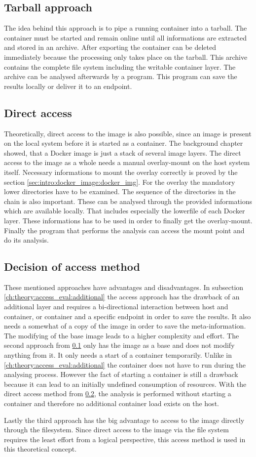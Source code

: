 \subsection{Tarball approach} 
\label{ch:theory:access_eval:tarball}
The idea behind this approach is to pipe a running container into a tarball. The container must be started and remain online until all informations are extracted and stored in an archive.
After exporting the container can be deleted immediately because the processing only takes place on the tarball.
This archive contains the complete file system including the writable container layer. The archive can be analysed afterwards by a program. This program can save the results locally or deliver it to an endpoint.

\subsection{Direct access} 
\label{ch:theory:access_eval:direct_access}
Theoretically, direct access to the image is also possible, since an image is present on the local system before it is started as a container.
The background chapter showed, that a Docker image is just a stack of several image layers. The direct access to the image as a whole needs a manual overlay-mount on the host system itself.
Necessary informations to mount the overlay correctly is proved by the section \ref{sec:intro:docker_image:docker_img}.
For the overlay the mandatory lower directories have to be examined. The sequence of the directories in the chain is also important. These can be analysed through the provided informations which are available locally. That includes especially the lowerfile of each Docker layer. These informations has to be used in order to finally get the overlay-mount. 
Finally the program that performs the analysis can access the mount point and do its analysis. 

\subsection{Decision of access method} 
\label{ch:theory:access_eval:decision_access}
These mentioned approaches have advantages and disadvantages. 	
In subsection \ref{ch:theory:access_eval:additional} the access approach has the drawback of an additional layer and requires a bi-directional interaction between host and container, or container and a specific endpoint in order to save the results. It also needs a somewhat of a copy of the image in order to save the meta-information. The modifying of the base image leads to a higher complexity and effort. 
The second approach from \ref{ch:theory:access_eval:tarball} only has the image as a base and does not modify anything from it. It only needs a start of a container temporarily. Unlike in \ref{ch:theory:access_eval:additional} the container does not have to run during the analysing process. However the fact of starting a container is still a drawback because it can lead to an initially undefined consumption of resources.
With the direct access method from \ref{ch:theory:access_eval:direct_access}, the analysis is performed without starting a container and therefore no additional container load exists on the host.

Lastly the third approach has the big advantage to access to the image directly through the filesystem. 
Since direct access to the image via the file system requires the least effort from a logical perspective, this access method is used in this theoretical concept.